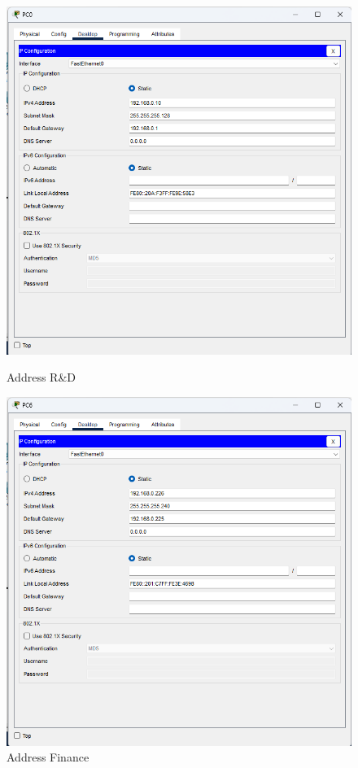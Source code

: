 \begin{figure}[H]
  \centering
  \begin{minipage}[t]{0.48\textwidth}
    \centering
    \includegraphics[width=\linewidth]{P1/img/IPr&D.png}
    \caption{Address R\&D}
    \label{fig:rnd}
  \end{minipage}
  \hfill
  \begin{minipage}[t]{0.48\textwidth}
    \centering
    \includegraphics[width=\linewidth]{P1/img/IPkeu.png}
    \caption{Address Finance}
    \label{fig:finance}
  \end{minipage}
\end{figure}

